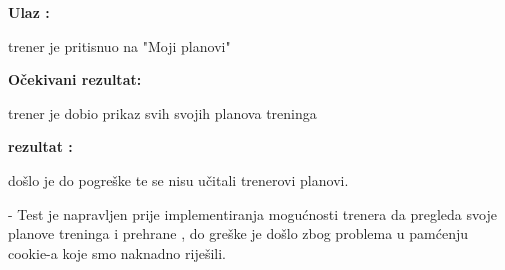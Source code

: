 	        \noindent {}
                \begin{packed_item}
						\item  \textbf{Ulaz : } 
						\item[] \begin{packed_enum}
	
							\item trener je pritisnuo na "Moji planovi"

						\end{packed_enum}
						\item  \textbf{Očekivani rezultat: } 
						\item[] \begin{packed_enum}
	
							\item trener je dobio prikaz svih svojih planova treninga

						\end{packed_enum}
						
						\item  \textbf{rezultat : }
						\item[] \begin{packed_enum}
	
							\item došlo je do pogreške te se nisu učitali trenerovi planovi.
                                                
                            - Test je napravljen prije implementiranja mogućnosti trenera da pregleda svoje planove treninga i prehrane , do greške je došlo zbog problema u pamćenju cookie-a koje smo naknadno riješili.
                        
						\end{packed_enum}

				\end{packed_item}
